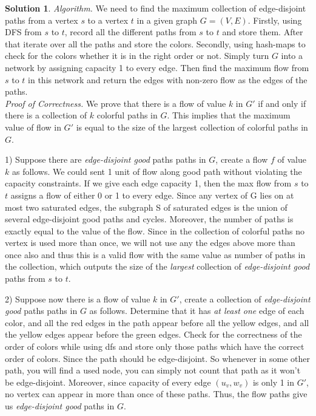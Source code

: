 \documentclass{article}
\theoremstyle{definition}
\newtheorem*{solution*}{Solution}
\newenvironment{solution}{\begin{solution*}}{{} \end{solution*}}
\begin{document}
	\medskip
		\begin{solution}
		
		\emph{Algorithm.}  We need to find the maximum collection of edge-disjoint paths from a vertex $s$ to a vertex $t$ in a given graph $G= (V, E)$. Firstly, using DFS from $s$ to $t$, record all the different paths from $s$ to $t$ and store them. After that iterate over all the paths and store the colors. Secondly, using hash-maps to check for the colors whether it is in the right order or not. Simply  turn $G$ into  a  network  by  assigning  capacity  1  to  every  edge.  Then find the maximum flow from $s$ to $t$ in this network and return the edges with non-zero flow as the edges of the paths. \\
		
		\emph{Proof of Correctness.} We prove that there is a flow of value $k$ in $G'$ if and only if there is a collection of $k$ colorful paths in $G$.  This implies that the maximum value of flow in $G'$ is equal to the size of the largest collection of colorful paths in $G$.
		
		1)  Suppose there are \emph{edge-disjoint good} paths paths in $G$, create a flow $f$ of value $k$ as follows. We could sent 1 unit of flow along good path without violating the capacity constraints. If we give each edge capacity 1, then the max flow from $s$ to $t$ assigns a flow of either 0 or 1 to every edge. Since any vertex of G lies on at most two saturated edges, the subgraph S of saturated edges is the union of several edge-disjoint good paths and cycles. Moreover, the number of paths is exactly equal to the value of the flow. Since in the collection of colorful paths no vertex is used more than once, we will not use any the edges above more than once also and thus this is a valid flow with the same value as number of paths in the collection, which outputs the size of the \emph{largest} collection of \emph{edge-disjoint good} paths from $s$ to $t$. 
		
		2) Suppose now there is a flow of value $k$ in $G'$, create a collection of \emph{edge-disjoint good} paths paths in $G$ as follows. Determine that it has \emph{at least one} edge of each color, and all the red edges in the path appear before all the yellow edges, and all the yellow edges appear before the green edges. Check for the correctness of the order of colors while using dfs and store only those paths which have the correct order of colors. Since the path should be edge-disjoint. So whenever in some other path, you will find a used node, you can simply not count that path as it won't be edge-disjoint. Moreover, since capacity of every edge $(u_v, w_v)$ is only 1 in $G'$, no vertex can appear in more than once of these paths. Thus, the flow paths give us \emph{edge-disjoint good} paths in $G$. \\
		 

\end{solution}
\end{document}
